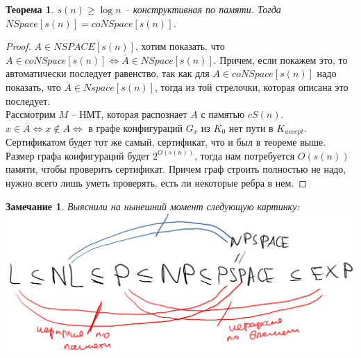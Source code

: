 \documentclass[12pt, letterpaper]{article}
\newtheorem{theorem}{Теорема}[section]
\newtheorem{note}{Замечание}[section]
\begin{document}
\begin{theorem}
$s(n) \geq \log n$ -- конструктивная по памяти. Тогда $NSpace[s(n)]=coNSpace[s(n)]$.
\end{theorem}
\begin{proof}
$A \in NSPACE[s(n)]$, хотим показать, что $A \in coNSpace[s(n)] \Longleftrightarrow \overline{A} \in NSpace[s(n)] $. Причем, если покажем это, то автоматически последует равенство, так как для $A \in coNSpace[s(n)]$ надо показать, что $\overline{A} \in Nspace[s(n)]$, тогда из той стрелочки, которая описана это последует.\\
Рассмотрим $M$ -- НМТ, которая распознает $A$ с памятью $cS(n)$. $x \in \overline{A} \Longleftrightarrow x \notin A \Longleftrightarrow$ в графе конфигураций $G_x$ из $K_0$ нет пути в $K_{accept}$.\\
Сертификатом будет тот же самый, сертификат, что и был в теореме выше. Размер графа конфигураций будет $2^{O(s(n))}$, тогда нам потребуется $O(s(n))$ памяти, чтобы проверить сертификат. Причем граф строить полностью не надо, нужно всего лишь уметь проверять, есть ли некоторые ребра в нем. 
\end{proof}
\begin{note}
Выяснили на нынешний момент следующую картинку:\\
\includegraphics[scale=0.5]{hierarchy2.png}
\end{note}
\end{document}
